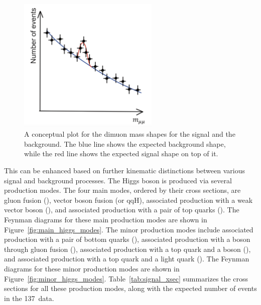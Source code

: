 \begin{figure}[!htb]
    \centering
    \captionsetup{justification=justified}
    \includegraphics[width=0.6\textwidth]{pics/hmm_mass_sketch.png}
    \caption{A conceptual plot for the dimuon mass shapes for the signal and the background. 
             The blue line shows the expected background shape, while the red line shows the expected signal shape on top of it.}
    \label{fig:dimuon_mass_shapes}
\end{figure}

This \SoB can be enhanced based on further kinematic distinctions between various signal and background processes.
The Higgs boson is produced via several production modes.
The four main modes, ordered by their cross sections, are gluon fusion (\ggH), vector boson fusion (\qqH or qqH), 
associated production with a weak vector boson (\VH), and associated production with a pair of top quarks (\ttH). 
The Feynman diagrams for these main production modes are shown in Figure~\ref{fig:main_higgs_modes}.
The minor production modes include associated production with a pair of bottom quarks (\bbH),
associated production with a \PZ boson through gluon fusion (\ggZH), 
associated production with a top quark and a \PW boson (\tHW), 
and associated production with a top quark and a light quark (\tHq). 
The Feynman diagrams for these minor production modes are shown in Figure~\ref{fig:minor_higgs_modes}.
Table~\ref{tab:signal_xsec} summarizes the cross sections for all these production modes, 
along with the expected number of events in the 137~\invfb data.

